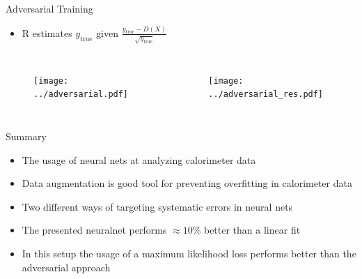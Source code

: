 \documentclass[10pt]{beamer}
\begin{document}
\begin{frame}{Adversarial Training}
  \begin{itemize}
  \item R estimates $y_{\text{true}}$ given $\frac{y_{\text{true}}-D(X)}{\sqrt{y_{\text{true}}}}$
  \end{itemize}
  \begin{columns}
    \begin{figure}[htp]
      \texttt{[image: ../adversarial.pdf]}
    \end{figure}
    \begin{figure}[htp]
      \texttt{[image: ../adversarial\_res.pdf]}
    \end{figure}
  \end{columns}
\end{frame}

\begin{frame}{Summary}
  \begin{itemize}
  \item The usage of neural nets at analyzing calorimeter data
  \item Data augmentation is good tool for preventing overfitting in calorimeter data
  \item Two different ways of targeting systematic errors in neural nets
  \item The presented neuralnet performs $\approx 10\%$ better than a linear fit
  \item In this setup the usage of a maximum likelihood loss performs better than
    the adversarial approach
  \end{itemize}
\end{frame}
\end{document}
